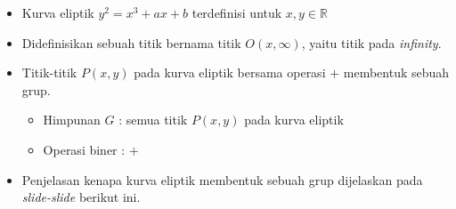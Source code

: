 \documentclass{article}
\begin{document}

\begin{itemize}
    \item Kurva eliptik $y^2 = x^3 + ax + b$ terdefinisi untuk $x, y \in \mathbb{R}$
    \item Didefinisikan sebuah titik bernama titik $O(x, \infty)$, yaitu titik pada \textit{infinity}.
    \item Titik-titik $P(x, y)$ pada kurva eliptik bersama operasi $+$ membentuk sebuah grup.
    \begin{itemize}
        \item Himpunan $G$ : semua titik $P(x, y)$ pada kurva eliptik
        \item Operasi biner : $+$
    \end{itemize}
    \item Penjelasan kenapa kurva eliptik membentuk sebuah grup dijelaskan pada \textit{slide-slide} berikut ini.
\end{itemize}
\end{document}
